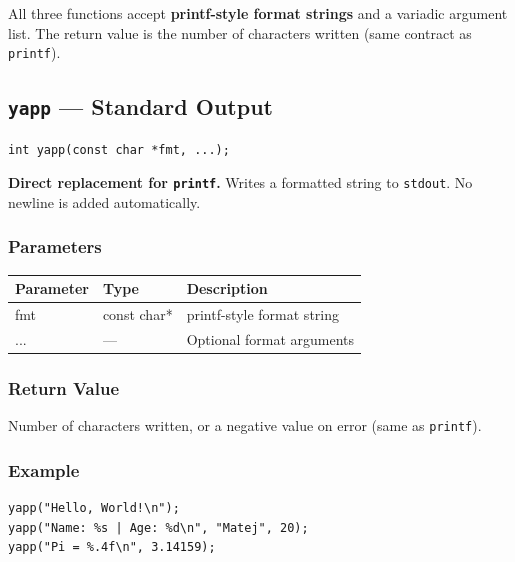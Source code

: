 \documentclass[11pt, a4paper]{article}
\newcommand{\fn}[1]{\texttt{\textbf{\textcolor{yapporange}{#1}}}}
\begin{document}
All three functions accept \textbf{printf-style format strings} and a variadic argument list.
The return value is the number of characters written (same contract as \texttt{printf}).

\subsection{\fn{yapp} — Standard Output}

\begin{tcolorbox}[codebox]
\begin{lstlisting}
int yapp(const char *fmt, ...);
\end{lstlisting}
\end{tcolorbox}

\textbf{Direct replacement for \texttt{printf}.} Writes a formatted string to \texttt{stdout}.
No newline is added automatically.

\subsubsection*{Parameters}

\begin{center}
\begin{tabular}{>{\ttfamily}l >{\ttfamily}l l}
\toprule
\normalfont\textbf{Parameter} & \normalfont\textbf{Type} & \textbf{Description} \\
\midrule
fmt & const char* & printf-style format string \\
... & —           & Optional format arguments \\
\bottomrule
\end{tabular}
\end{center}

\subsubsection*{Return Value}

Number of characters written, or a negative value on error (same as \texttt{printf}).

\subsubsection*{Example}

\begin{tcolorbox}[codebox]
\begin{lstlisting}
yapp("Hello, World!\n");
yapp("Name: %s | Age: %d\n", "Matej", 20);
yapp("Pi = %.4f\n", 3.14159);
\end{lstlisting}
\end{tcolorbox}
\end{document}
